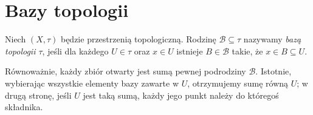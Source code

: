 \section{Bazy topologii}
\label{sec:topog-bazy}

\begin{definicja}
\label{def:topog-baza}
Niech $(X,\tau)$ będzie przestrzenią topologiczną.
Rodzinę $\mathcal B\subseteq\tau$ nazywamy
\emph{bazą topologii $\tau$}, jeśli dla każdego
$U\in\tau$ oraz $x\in U$ istnieje $B\in\mathcal B$
takie, że $x\in B\subseteq U$.
\end{definicja}

Równoważnie, każdy zbiór otwarty jest sumą pewnej podrodziny
$\mathcal B$. Istotnie, wybierając wszystkie elementy bazy
zawarte w $U$, otrzymujemy sumę równą $U$;
w drugą stronę, jeśli $U$ jest taką sumą, każdy
jego punkt należy do któregoś składnika.

